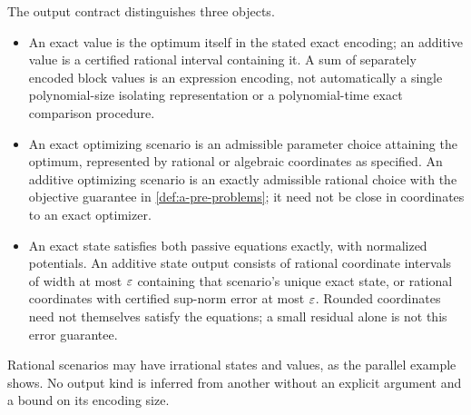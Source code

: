 The output contract distinguishes three objects.
\begin{itemize}
\item An exact value is the optimum itself in the stated exact encoding;
an additive value is a certified rational interval containing it.
A sum of separately encoded block values is an expression encoding,
not automatically a single polynomial-size isolating representation
or a polynomial-time exact comparison procedure.
\item An exact optimizing scenario is an admissible parameter choice
attaining the optimum, represented by rational or algebraic coordinates
as specified. An additive optimizing scenario is an exactly admissible
rational choice with the objective guarantee in
\cref{def:a-pre-problems}; it need not be close in coordinates to an
exact optimizer.
\item An exact state satisfies both passive equations exactly, with
normalized potentials. An additive state output consists of rational
coordinate intervals of width at most $\varepsilon$ containing that scenario's
unique exact state, or rational coordinates with certified sup-norm
error at most $\varepsilon$. Rounded coordinates need not themselves satisfy
the equations; a small residual alone is not this error guarantee.
\end{itemize}
Rational scenarios may have irrational states and values, as the
parallel example shows. No output kind is inferred from another without
an explicit argument and a bound on its encoding size.

